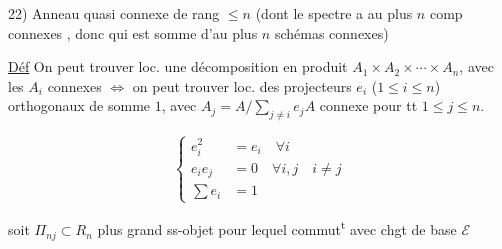 22) Anneau quasi  connexe de rang $\leq n$ (dont le spectre a au plus $n$ comp connexes , donc qui est somme d'au plus $n$ schémas connexes)

 \uline{Déf} On peut trouver loc. une décomposition en produit $A_1\times A_2\times\cdots\times A_n$, avec les $A_i$ connexes $\Longleftrightarrow$ on peut trouver loc.  des projecteurs $e_i$ ($1\leq i\leq n$) orthogonaux de somme $1$, avec $A_j=A/\sum_{j\ne i}e_j A$ connexe pour tt $1\leq j\leq n$.


\[
 \left\{\begin{aligned}
 e_i^2&=e_i\quad\forall i\\
 e_i e_j&=0\quad\forall i,j\quad i\ne j\\
 \sum e_i&=1
 \end{aligned}\right.
\]



\qquad soit $\Pi_{nj}\subset R_n$ plus grand ss-objet pour lequel  commut\textsuperscript{t} avec chgt de base  \uline{$\mathcal E$}
